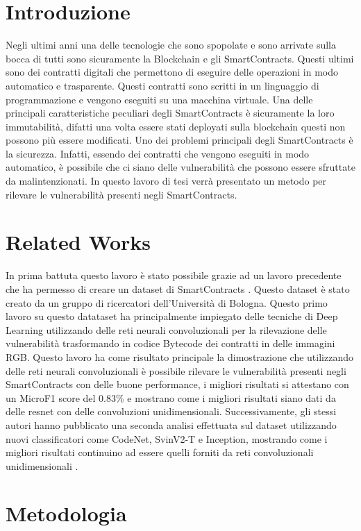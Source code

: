 \documentclass[12pt,a4paper]{report}
\begin{document}
\chapter{Introduzione}
Negli ultimi anni una delle tecnologie che sono spopolate e sono arrivate sulla bocca di tutti sono sicuramente la Blockchain e gli SmartContracts. Questi ultimi sono dei contratti digitali che permettono di eseguire delle operazioni in modo automatico e trasparente. Questi contratti sono scritti in un linguaggio di programmazione e vengono eseguiti su una macchina virtuale. Una delle principali caratteristiche peculiari degli SmartContracts è sicuramente la loro immutabilità, difatti una volta essere stati deployati sulla blockchain questi non possono più essere modificati.  Uno dei problemi principali degli SmartContracts è la sicurezza. Infatti, essendo dei contratti che vengono eseguiti in modo automatico, è possibile che ci siano delle vulnerabilità che possono essere sfruttate da malintenzionati. In questo lavoro di tesi verrà presentato un metodo per rilevare le vulnerabilità presenti negli SmartContracts. 
\chapter{Related Works}
In prima battuta questo lavoro è stato possibile grazie ad un lavoro precedente che ha permesso di creare un dataset di SmartContracts \cite{RossiniPaper1}. Questo dataset è stato creato da un gruppo di ricercatori dell'Università di Bologna. Questo primo lavoro su questo datataset ha principalmente impiegato delle tecniche di Deep Learning utilizzando delle reti neurali convoluzionali per la rilevazione delle vulnerabilità trasformando in codice Bytecode dei contratti in delle immagini RGB. Questo lavoro ha  come risultato principale la dimostrazione che utilizzando delle reti neurali convoluzionali è possibile rilevare le vulnerabilità presenti negli SmartContracts con delle buone performance, i migliori risultati si attestano con un MicroF1 score del 0.83\% e mostrano come i migliori risultati siano dati da delle resnet con delle convoluzioni unidimensionali. Successivamente, gli stessi autori hanno pubblicato una seconda analisi effettuata sul dataset utilizzando nuovi classificatori come CodeNet, SvinV2-T e Inception, mostrando come i migliori risultati  continuino ad essere quelli forniti da reti convoluzionali unidimensionali \cite{RossiniPaper2}.

\chapter{Metodologia}
\end{document}
